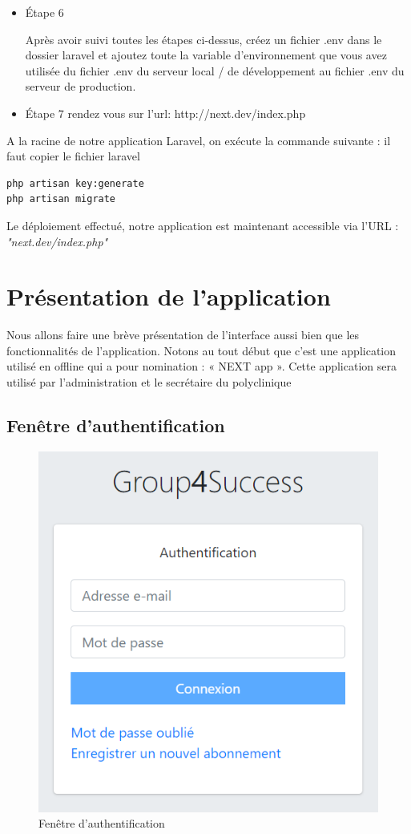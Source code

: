 \begin{itemize}
	
	
	
	\item Étape 6
	
	Après avoir suivi toutes les étapes ci-dessus, créez un fichier .env dans le dossier laravel et
	ajoutez toute la variable d'environnement que vous avez utilisée du fichier .env du serveur local /
	de développement au fichier .env du serveur de production.
	
	
	\item Étape 7
	rendez vous sur l'url: http://next.dev/index.php
	
	
	
\end{itemize}




A la racine de notre application Laravel, on exécute la commande suivante : 
il faut copier le fichier laravel
\begin{verbatim}
php artisan key:generate
php artisan migrate
\end{verbatim}

Le déploiement effectué, notre application est maintenant accessible via l'URL : \\ \emph{"next.dev/index.php"}



\section{Présentation de l'application}
Nous allons faire une brève présentation de l'interface aussi bien que les fonctionnalités
de l'application. Notons au tout début que c’est une application utilisé en offline qui a
pour nomination : « NEXT app ». Cette application sera utilisé par l'administration et le secrétaire du polyclinique

\subsection{Fenêtre d'authentification}
\begin{figure}[h]
	\centering
	\includegraphics[width=0.55\linewidth]{"Chapitre4/images/authentification"}
	\caption{Fenêtre d'authentification}
	\label{Fenêtre d'authentification}
\end{figure}

